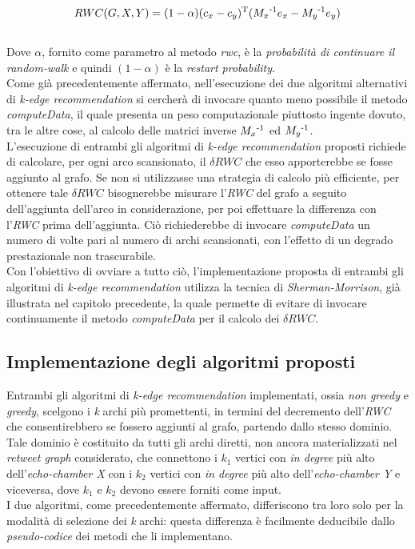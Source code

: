 \\
\begin{equation}
RWC(G,X,Y) = (1 - \alpha)(c_x - c_y)\textsuperscript{T}(M_x\textsuperscript{-1}e_x - M_y\textsuperscript{-1}e_y)
\end{equation}
\\
Dove $\alpha$, fornito come parametro al metodo \textit{rwc}, è la \textit{probabilità di continuare il random-walk} e quindi $(1-\alpha)$ è la \textit{restart probability}. 
\\Come già precedentemente affermato, nell'esecuzione dei due algoritmi alternativi di \textit{k-edge recommendation} si cercherà di invocare quanto meno possibile il metodo \textit{computeData}, il quale presenta un peso computazionale piuttosto ingente dovuto, tra le altre cose, al calcolo delle matrici inverse  $M_x\textsuperscript{-1}$ ed $M_y\textsuperscript{-1}$. 
\\L'esecuzione di entrambi gli algoritmi di \textit{k-edge recommendation} proposti richiede di calcolare, per ogni arco scansionato, il \textit{$\delta RWC$} che esso apporterebbe se fosse aggiunto al grafo. Se non si utilizzasse una strategia di calcolo più efficiente, per ottenere tale \textit{$\delta RWC$} bisognerebbe misurare l'\textit{RWC} del grafo a seguito dell'aggiunta dell'arco in considerazione, per poi effettuare la differenza con l'\textit{RWC} prima dell'aggiunta. Ciò richiederebbe di invocare \textit{computeData} un numero di volte pari al numero di archi scansionati, con l'effetto di un degrado prestazionale non trascurabile. \\Con l'obiettivo di ovviare a tutto ciò, l'implementazione proposta di entrambi gli algoritmi di \textit{k-edge recommendation} utilizza la tecnica di \textit{Sherman-Morrison}, già illustrata nel capitolo precedente, la quale permette di evitare di invocare continuamente il metodo \textit{computeData} per il calcolo dei \textit{$\delta RWC$}. 

\subsection{Implementazione degli algoritmi proposti}
Entrambi gli algoritmi di \textit{k-edge recommendation} implementati, ossia \textit{non greedy} e \textit{greedy}, scelgono i \textit{k} archi più promettenti, in termini del decremento dell'\textit{RWC} che consentirebbero se fossero aggiunti al grafo, partendo dallo stesso dominio. Tale dominio è costituito da tutti gli archi diretti, non ancora materializzati nel \textit{retweet graph} considerato, che connettono i \textit{$k_1$} vertici con \textit{in degree} più alto dell'\textit{echo-chamber X} con i \textit{$k_2$} vertici con \textit{in degree} più alto dell'\textit{echo-chamber Y} e viceversa, dove \textit{$k_1$} e \textit{$k_2$} devono essere forniti come input. 
\\I due algoritmi, come precedentemente affermato, differiscono tra loro solo per la modalità di selezione dei \textit{k} archi: questa differenza è facilmente deducibile dallo \textit{pseudo-codice} dei metodi che li implementano.

